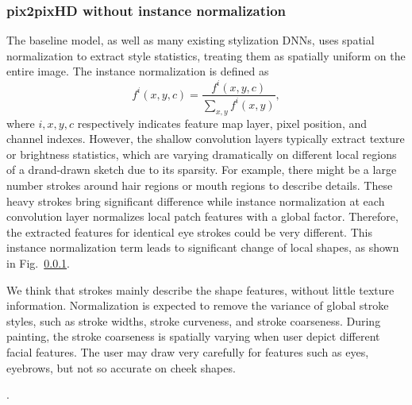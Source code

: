 

\subsubsection{pix2pixHD without instance normalization}
The baseline model, as well as many existing stylization DNNs, uses spatial normalization  to extract style statistics, treating them as spatially uniform on the entire image. 
The instance normalization is defined as
\begin{equation}\label{eq:instance-norm}
f^i(x,y,c)=\frac{f^i(x,y,c)}{\sum_{x,y}f^i(x,y)},
\end{equation}
where $i, x,y,c$ respectively indicates feature map layer, pixel position, and channel indexes.  
However, the shallow convolution layers typically extract texture or brightness statistics, which are varying dramatically on different local regions of a drand-drawn sketch due to its sparsity. For example, there might be a large number strokes around hair regions or mouth regions to describe details. These heavy strokes bring significant difference while instance normalization at each convolution layer normalizes local patch features with a global factor. Therefore, the extracted features for identical eye strokes could be very different. 
This instance normalization term leads to significant change of local shapes, as shown in Fig.~\ref{}.


We think that strokes mainly describe the shape features, without little texture information. Normalization is expected to remove the variance of global stroke styles, such as stroke widths, stroke curveness, and stroke coarseness. 
During painting, the stroke coarseness is spatially varying when user depict different facial features. 
The user may draw very carefully for features such as eyes, eyebrows, but not so accurate on cheek shapes. 




%






. 